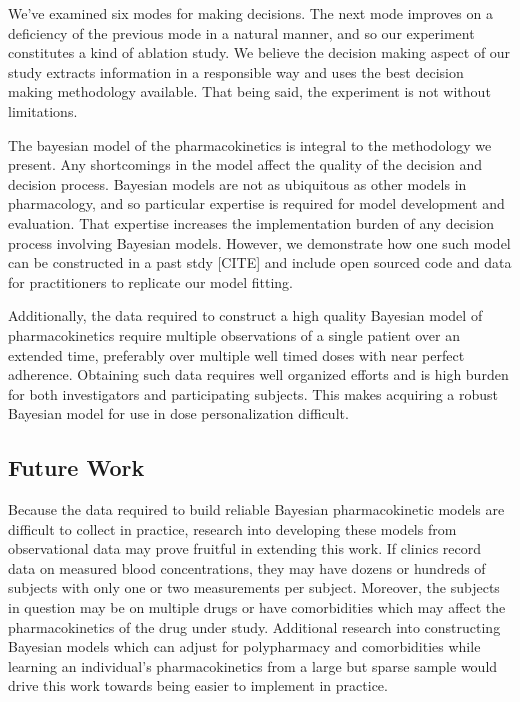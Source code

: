 We’ve examined six modes for making decisions.  The next mode improves on a deficiency of the previous mode in a natural manner, and so our experiment constitutes a kind of ablation study.  We believe the decision making aspect of our study extracts information in a responsible way and uses the best decision making methodology available.  That being said, the experiment is not without limitations.

The bayesian model of the pharmacokinetics is integral to the methodology we present.  Any shortcomings in the model affect the quality of the decision and decision process.  Bayesian models are not as ubiquitous as other models in pharmacology, and so particular expertise is required for model development and evaluation.  That expertise increases the implementation burden of any decision process involving Bayesian models.  However, we demonstrate how one such model can be constructed in a past stdy [CITE] and include open sourced code and data for practitioners to replicate our model fitting.

Additionally, the data required to construct a high quality Bayesian model of pharmacokinetics require multiple observations of a single patient over an extended time, preferably over multiple well timed doses with near perfect adherence.  Obtaining such data requires well organized efforts and is high burden for both investigators and participating subjects.  This makes acquiring a robust Bayesian model for use in dose personalization difficult.

\subsection{Future Work}

Because the data required to build reliable Bayesian pharmacokinetic models are difficult to collect in practice, research into developing these models from observational data may prove fruitful in extending this work. If clinics record data on measured blood concentrations, they may have dozens or hundreds of subjects with only one or two measurements per subject.  Moreover, the subjects in question may be on multiple drugs or have comorbidities which may affect the pharmacokinetics of the drug under study.  Additional research into constructing Bayesian models which can adjust for polypharmacy and comorbidities while learning an individual’s pharmacokinetics from a large but sparse sample would drive this work towards being easier to implement in practice.


